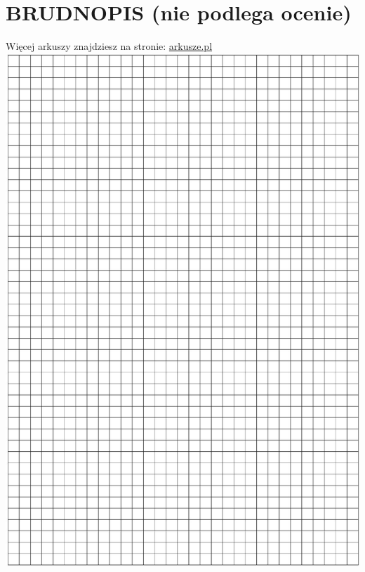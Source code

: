 \documentclass[10pt]{article}
\begin{document}
\section*{BRUDNOPIS (nie podlega ocenie)}
Więcej arkuszy znajdziesz na stronie: \href{http://arkusze.pl}{arkusze.pl}\\
\includegraphics[max width=\textwidth, center]{2024_11_21_5abc0108fbbc287103ecg-20}
\end{document}
